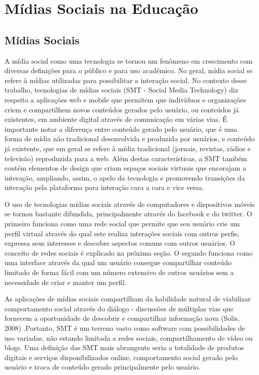 \chapter{Mídias Sociais na Educação}
\label{cap:midias-sociais}

\section{Mídias Sociais}

A mídia social como uma tecnologia se tornou um fenômeno em crescimento com
diversas definições para o público e para uso acadêmico. No geral, mídia social
se refere à mídias utilizadas para possibilitar a interação social. No contexto
desse trabalho, tecnologias de mídias sociais (SMT - Social Media Technology)
diz respeito a aplicações web e mobile que permitem que indivíduos e organizações
criem e compartilhem novos conteúdos gerados pelo usuário, ou conteúdos já
existentes, em ambiente digital através de comunicação em várias vias. É
importante notar a diferença entre conteúdo gerado pelo usuário, que é uma forma
de mídia não tradicional desenvolvida e produzida por usuários, e conteúdo já
existente, que em geral se refere à mídia tradicional (jornais, revistas, rádios
e televisão) reproduzida para a web. Além destas características, a SMT também
contém elementos de design que criam espaços sociais virtuais que encorajam a 
interação, ampliando, assim, o apelo da tecnologia e promovendo transições da 
interação pela plataforma para interação cara a cara e vice versa.

O uso de tecnologias mídias sociais através de computadores e dispositivos móveis
se tornou bastante difundida, principalmente através do facebook e do twitter.
O primeiro funciona como uma rede social que permite que seu usuário crie um 
perfil virtual através do qual este realiza interações sociais com outros perfis,
expressa seus interesses e descobre aspectos comuns com outros usuários. O conceito
de redes sociais é explicado na próxima seção. O segundo funciona como uma
interface através da qual um usuário consegue compartilhar conteúdo limitado de
forma fácil com um número extensivo de outros usuários sem a necessidade de criar
e manter um perfil.

As aplicações de mídias sociais compartilham da habilidade natural de viabilizar
comportamento social através do diálogo - discussões de múltiplas vias que
fornecem a oportunidade de descobrir e compartilhar informação nova (Solis, 2008)
.Portanto, SMT é um terreno vasto como software com
possibilidades de uso variadas, não estando limitada a redes sociais,
compartilhamento de vídeo ou blogs. Uma definição das SMT mais abrangente seria
a totalidade de produtos digitais e serviços disponibilizados online,
comportamento social gerado pelo usuário e troca de conteúdo gerado principalmente
pelo usuário.

